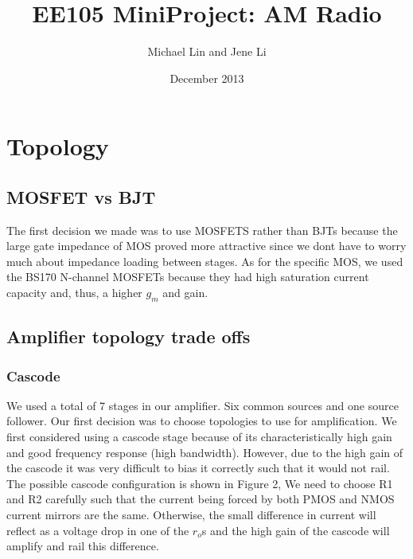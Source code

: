 \documentclass[11pt, twoside, letterpaper]{article}
\title{EE105 MiniProject: AM Radio}
\author{Michael Lin and Jene Li}
\date{December 2013}
\begin{document}
\maketitle

\section{Topology}
\subsection{MOSFET vs BJT}

The first decision we made was to use MOSFETS rather than BJTs because the large gate impedance of MOS proved more attractive since we dont have to
worry much about impedance loading between stages. As for the specific MOS, we used the BS170 N-channel MOSFETs because they had high saturation
current capacity and, thus, a higher $g_m$ and gain.

\subsection{Amplifier topology trade offs}

\subsubsection{Cascode}
We used a total of 7 stages in our amplifier. Six common sources and one source follower.
Our first decision was to choose topologies to use for amplification. We first considered using a cascode stage because of 
its characteristically high gain and good frequency response (high bandwidth). However, due to the high gain of the cascode
it was very difficult to bias it correctly such that it would not rail. The possible cascode configuration is shown in Figure 2,
We need to choose R1 and R2 carefully such that the current being forced by both PMOS and NMOS current mirrors are the same.
Otherwise, the small difference in current will reflect as a voltage drop in one of the $r_o$s and the high gain of the cascode
will amplify and rail this difference.
\end{document}
